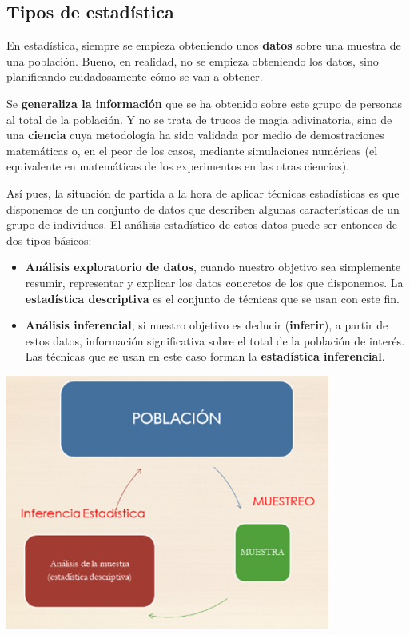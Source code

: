 \documentclass[
  letterpaper,
  DIV=11,
  numbers=noendperiod]{scrreprt}
\begin{document}
\subsection{Tipos de estadística}\label{tipos-de-estaduxedstica}

En estadística, siempre se empieza obteniendo unos \textbf{datos} sobre
una muestra de una población. Bueno, en realidad, no se empieza
obteniendo los datos, sino planificando cuidadosamente cómo se van a
obtener.

Se \textbf{generaliza la información} que se ha obtenido sobre este
grupo de personas al total de la población. Y no se trata de trucos de
magia adivinatoria, sino de una \textbf{ciencia} cuya metodología ha
sido validada por medio de demostraciones matemáticas o, en el peor de
los casos, mediante simulaciones numéricas (el equivalente en
matemáticas de los experimentos en las otras ciencias).

Así pues, la situación de partida a la hora de aplicar técnicas
estadísticas es que disponemos de un conjunto de datos que describen
algunas características de un grupo de individuos. El análisis
estadístico de estos datos puede ser entonces de dos tipos básicos:

\begin{itemize}
\item
  \textbf{Análisis exploratorio de datos}, cuando nuestro objetivo sea
  simplemente resumir, representar y explicar los datos concretos de los
  que disponemos. La \textbf{estadística descriptiva} es el conjunto de
  técnicas que se usan con este fin.
\item
  \textbf{Análisis inferencial}, si nuestro objetivo es deducir
  (\textbf{inferir}), a partir de estos datos, información significativa
  sobre el total de la población de interés. Las técnicas que se usan en
  este caso forman la \textbf{estadística inferencial}.
\end{itemize}

\begin{center}
\includegraphics[width=0.8\textwidth,height=\textheight]{Figuras/muestreo_inferencia.png}
\end{center}
\end{document}
